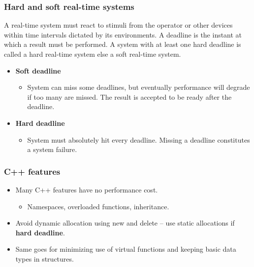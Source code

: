 \subsubsection{Hard and soft real-time systems}
A real-time system must react to stimuli from the operator or other devices within time intervals dictated by its environments. 
A deadline is the instant at which a result must be performed. 
A system with at least one hard deadline is called a hard real-time system else a soft real-time system.

\begin{itemize}
	\item \textbf{Soft deadline}
	\begin{itemize}
		\item System can miss some deadlines, but eventually performance will degrade if too many are missed. The result is accepted to be ready after the deadline.
	\end{itemize}
	\item \textbf{Hard deadline}
	\begin{itemize}
		\item System must absolutely hit every deadline. Missing a deadline constitutes a system failure.
	\end{itemize}
\end{itemize}

\subsubsection{C++ features}
\begin{itemize}
	\item Many C++ features have no performance cost.
	\begin{itemize}
		\item Namespaces, overloaded functions, inheritance. 
	\end{itemize}
	\item Avoid dynamic allocation using new and delete – use static allocations
if \textbf{hard deadline}.
	\item Same goes for minimizing use of virtual functions and keeping basic data types in structures.
\end{itemize}

